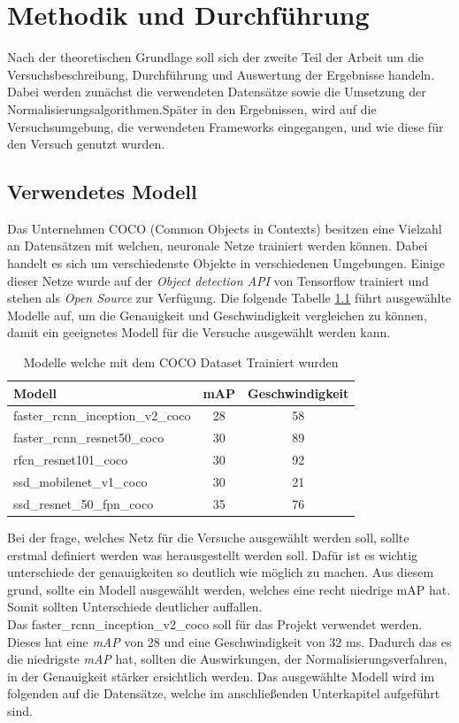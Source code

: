 \chapter{Methodik und Durchführung}\label{s.methudurchf}
Nach der theoretischen Grundlage soll sich der zweite Teil der Arbeit um die Versuchsbeschreibung, Durchführung und Auswertung der Ergebnisse handeln. Dabei werden zunächst die verwendeten Datensätze sowie die Umsetzung der Normalisierungsalgorithmen.Später in den Ergebnissen, wird auf die Versuchsumgebung, die verwendeten Frameworks eingegangen, und wie diese für den Versuch genutzt wurden.
 \section{Verwendetes Modell}\label{s.modell}
Das Unternehmen COCO \cite{common2018data} (Common Objects in Contexts) besitzen eine Vielzahl an Datensätzen mit welchen, neuronale Netze trainiert werden können. Dabei handelt es sich um verschiedenste Objekte in verschiedenen Umgebungen. Einige dieser Netze wurde auf der \textit{Object detection API} von Tensorflow trainiert und stehen als \textit{Open Source} zur Verfügung. Die folgende Tabelle \ref{tab:cocomodels} führt ausgewählte Modelle auf, um die Genauigkeit und Geschwindigkeit vergleichen zu können, damit ein geeignetes Modell für die Versuche ausgewählt werden kann.
\begin{table}
[h]
\caption{Modelle \cite{google2018tens} welche mit dem COCO Dataset Trainiert wurden \cite{common2018data}}
\label{tab:cocomodels}
\centering
\begin{tabular}{|l|c|c|}
\hline
Modell & mAP & Geschwindigkeit\\
\hline
faster\_rcnn\_inception\_v2\_coco & 28 & 58\\
faster\_rcnn\_resnet50\_coco & 30 & 89\\
rfcn\_resnet101\_coco & 30 & 92\\
ssd\_mobilenet\_v1\_coco & 30 & 21\\
ssd\_resnet\_50\_fpn\_coco & 35 & 76\\
\hline
\end{tabular}
\end{table}
Bei der frage, welches Netz für die Versuche ausgewählt werden soll, sollte erstmal definiert werden was herausgestellt werden soll. Dafür ist es wichtig unterschiede der genauigkeiten so deutlich wie möglich zu machen. Aus diesem grund, sollte ein Modell ausgewählt werden, welches eine recht niedrige mAP hat. Somit sollten Unterschiede deutlicher auffallen.\\
Das faster\_rcnn\_inception\_v2\_coco soll für das Projekt verwendet werden. Dieses hat eine \textit{mAP} von 28 und eine Geschwindigkeit von 32 ms. Dadurch das es die niedrigste \textit{mAP} hat, sollten die Auswirkungen, der Normalisierungsverfahren, in der Genauigkeit stärker ersichtlich werden. Das ausgewählte Modell wird im folgenden auf die Datensätze, welche im anschließenden Unterkapitel aufgeführt sind.
